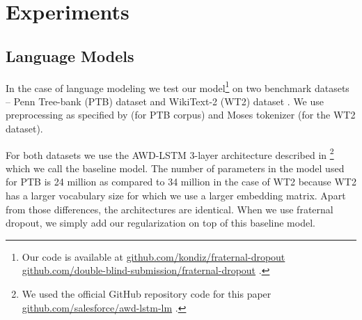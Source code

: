 \documentclass{article} \usepackage{iclr2018_conference,times}
\begin{document}
\section{Experiments}

\subsection{Language Models} \label{subsec:elm}
In the case of language modeling we test our model\footnote{Our code is available at 
\ificlrfinal
\url{github.com/kondiz/fraternal-dropout}
\else
\url{github.com/double-blind-submission/fraternal-dropout}
\fi
.} on two benchmark datasets -- Penn Tree-bank (PTB) dataset \citep{marcus1993building} and WikiText-2 (WT2) dataset \citep{DBLP:journals/corr/MerityXBS16}. We use preprocessing as specified by \citet{mikolov2010recurrent} (for PTB corpus) and Moses tokenizer \citet{koehn2007moses} (for the WT2 dataset).

For both datasets we use the AWD-LSTM 3-layer architecture described in \citet{merity2017regularizing}\footnote{We used the official GitHub repository code for this paper \url{github.com/salesforce/awd-lstm-lm} .} which we call the baseline model. The number of parameters in the model used for PTB is 24 million as compared to 34 million in the case of WT2 because WT2 has a larger vocabulary size for which we use a larger embedding matrix. Apart from those differences, the architectures are identical. When we use fraternal dropout, we simply add our regularization on top of this baseline model.
\end{document}
